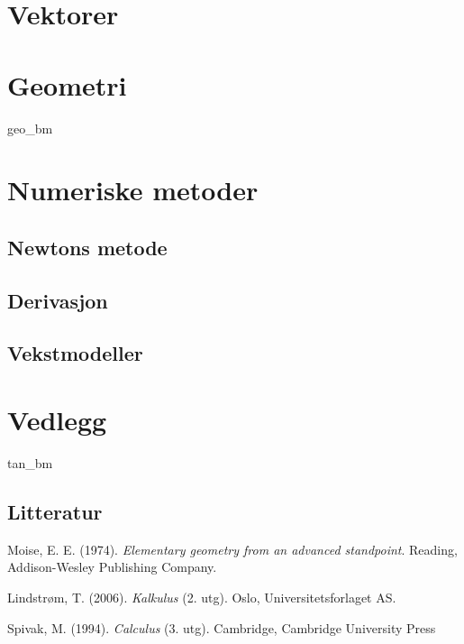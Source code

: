 	\chapter{Vektorer}
	
	\chapter{Geometri}
	{geo_bm}

	\chapter{Numeriske metoder}
	\section{Newtons metode}
	\section{Derivasjon}
	\section{Vekstmodeller}
	
	\chapter*{Vedlegg}
	{tan_bm}
	

	
	\newpage
	\section*{Litteratur}
	Moise, E. E. (1974). \textit{Elementary geometry from an advanced standpoint}. Reading, Addison-Wesley Publishing Company.\vsk
	
	Lindstrøm, T. (2006). \textit{Kalkulus} (2. utg). Oslo, Universitetsforlaget AS.\vsk
	
	Spivak, M. (1994). \textit{Calculus} (3. utg). Cambridge, Cambridge University Press
	
	


